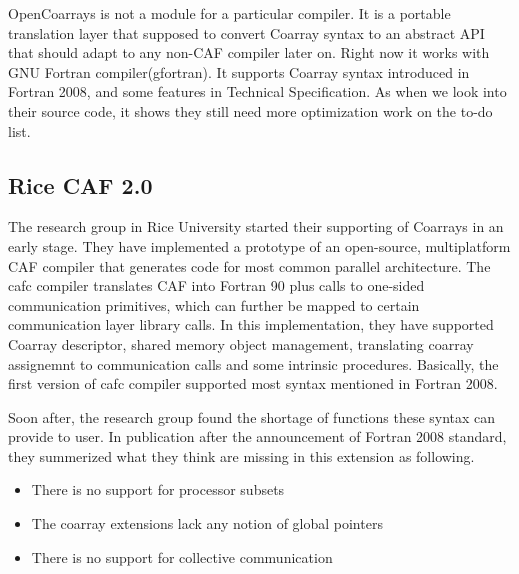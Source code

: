 OpenCoarrays is not a module for a particular compiler. It is a portable translation layer that supposed to convert Coarray syntax to an abstract API that should adapt to any non-CAF compiler later on. Right now it works with GNU Fortran compiler(gfortran). It supports Coarray syntax introduced in Fortran 2008, and some features in Technical Specification. As when we look into their source code, it shows they still need more optimization work on the to-do list. 

\subsection{Rice CAF 2.0}\label{sec:caf2.0}
The research group in Rice University started their supporting of Coarrays in an early stage\cite{dotsenko2004multi}. They have implemented a prototype of an open-source, multiplatform CAF compiler that generates code for most common parallel architecture. The cafc compiler translates CAF into Fortran 90 plus calls to one-sided communication primitives, which can further be mapped to certain communication layer library calls. In this implementation, they have supported Coarray descriptor, shared memory object management,  translating coarray assignemnt to communication calls and some intrinsic procedures. Basically, the first version of cafc compiler supported most syntax mentioned in Fortran 2008. 

Soon after, the research group found the shortage of functions these syntax can provide to user. In publication\cite{mellor2009new} after the announcement of Fortran 2008 standard, they summerized what they think are missing in this extension as following.
\begin{itemize}
\item There is no support for processor subsets
\item The coarray extensions lack any notion of global pointers
\item There is no support for collective communication
\end{itemize}

